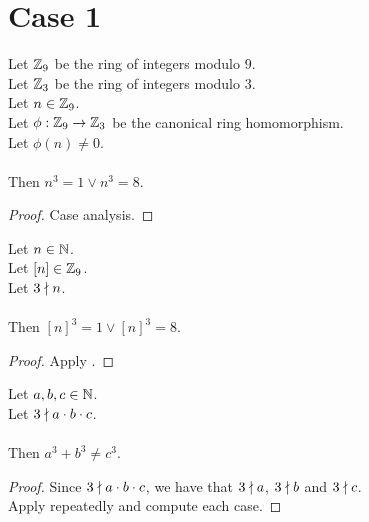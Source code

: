 
\chapter{Case 1}

\begin{lemma}
  \label{lmm:cube_of_castHom_ne_zero}
  \leanok
  Let $\mathbb{Z}_9$ be the ring of integers modulo $9$. \\
  Let $\mathbb{Z}_3$ be the ring of integers modulo $3$. \\
  Let $n \in \mathbb{Z}_9$. \\
  Let $\phi : \mathbb{Z}_9 \to \mathbb{Z}_3$ be the canonical ring homomorphism. \\
  Let $\phi(n) \neq 0$. \\ \\
  Then $n^3=1 \lor n^3=8$.
\end{lemma}
\begin{proof}
  \leanok
  Case analysis.
\end{proof}

\begin{lemma}
  \label{lmm:cube_of_not_dvd}
  \leanok
  Let $n \in \mathbb{N}$. \\
  Let $\left[n \right] \in \mathbb{Z}_9$. \\
  Let $3 \nmid n$. \\ \\
  Then $\left[n \right]^3 = 1 \lor \left[n \right]^3 = 8$.
\end{lemma}
\begin{proof}
  \leanok
  Apply .
\end{proof}

\begin{theorem}
    \label{thm:fermatLastTheoremThree_case_1}
    \leanok
    Let $a, b, c \in \mathbb{N}$. \\
    Let $3 \nmid a \cdot b \cdot c$. \\\\
    Then $a ^ 3 + b ^ 3 \neq c ^ 3$.
\end{theorem}
\begin{proof}
  \leanok
  Since $3 \nmid a \cdot b \cdot c$,
  we have that $3 \nmid a$, $3 \nmid b$ and $3 \nmid c$. \\
  Apply  repeatedly and compute each case.
\end{proof}
